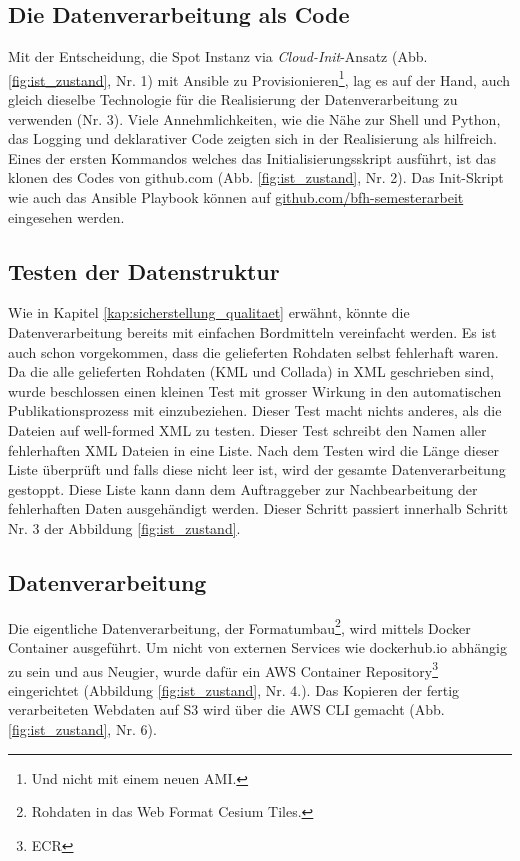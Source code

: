 \subsection{Die Datenverarbeitung als Code}
Mit der Entscheidung, die Spot Instanz via \emph{Cloud-Init}-Ansatz (Abb. \ref{fig:ist_zustand}, Nr. 1) mit Ansible zu Provisionieren\footnote{Und nicht mit einem neuen AMI.}, lag es auf der Hand, auch gleich dieselbe Technologie für die Realisierung der Datenverarbeitung zu verwenden (Nr. 3). 
Viele Annehmlichkeiten, wie die Nähe zur Shell und Python, das Logging und deklarativer Code zeigten sich in der Realisierung als hilfreich. Eines der ersten Kommandos welches das Initialisierungsskript ausführt, ist das klonen des Codes von github.com (Abb. \ref{fig:ist_zustand}, Nr. 2). Das Init-Skript wie auch das Ansible Playbook können auf \href{https://github.com/bfh-semesterarbeit/up-and-running-dataprocessing}{github.com/bfh-semesterarbeit} eingesehen werden.


\subsection{Testen der Datenstruktur}
Wie in Kapitel \ref{kap:sicherstellung_qualitaet} erwähnt, könnte die Datenverarbeitung bereits mit einfachen Bordmitteln vereinfacht werden. Es ist auch schon vorgekommen, dass die gelieferten Rohdaten selbst fehlerhaft waren. Da die alle gelieferten Rohdaten (KML und Collada) in XML geschrieben sind, wurde beschlossen einen kleinen Test mit grosser Wirkung in den automatischen Publikationsprozess mit einzubeziehen. Dieser Test macht nichts anderes, als die Dateien auf well-formed XML zu testen. 
Dieser Test schreibt den Namen aller fehlerhaften XML Dateien in eine Liste. Nach dem Testen wird die Länge dieser Liste überprüft und falls diese nicht leer ist, wird der gesamte Datenverarbeitung gestoppt. Diese Liste kann dann dem Auftraggeber zur Nachbearbeitung der fehlerhaften Daten ausgehändigt werden. Dieser Schritt passiert innerhalb Schritt Nr. 3 der  Abbildung \ref{fig:ist_zustand}.

\subsection{Datenverarbeitung}
Die eigentliche Datenverarbeitung, der Formatumbau\footnote{Rohdaten in das Web Format Cesium Tiles.}, wird mittels Docker Container ausgeführt. Um nicht von externen Services wie dockerhub.io abhängig zu sein und aus Neugier, wurde dafür ein AWS Container Repository\footnote{ECR} eingerichtet (Abbildung \ref{fig:ist_zustand}, Nr. 4.). Das Kopieren der fertig verarbeiteten Webdaten auf S3 wird über die AWS CLI gemacht (Abb. \ref{fig:ist_zustand}, Nr. 6).

